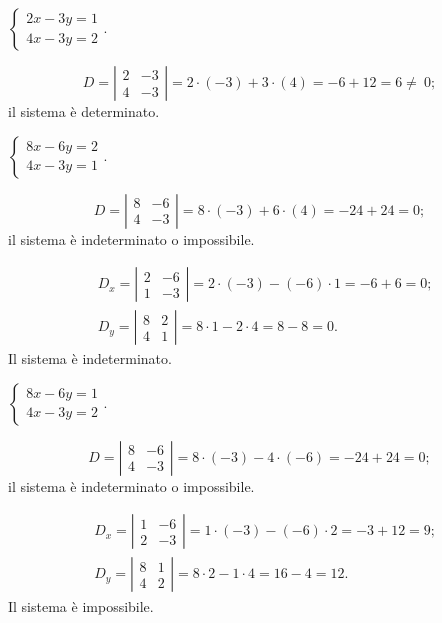 \begin{exrig}
 \begin{esempio}
$\left\{\begin{array}{l}2x-3y=1 \\4x-3y=2 \end{array}\right..$

\[D=\left|\begin{array}{cc}2&-3\\4&-3\end{array}\right|=2\cdot (-3)+3\cdot (4)=-6+12=6\neq~0;\]
il sistema è determinato.
 \end{esempio}

 \begin{esempio}
$\left\{\begin{array}{l}8x-6y=2 \\4x-3y=1 \end{array}\right..$

\[D=\left|\begin{array}{cc}{8}&{-6}\\{4}&{-3}\end{array}\right|=8\cdot (-3)+6\cdot (4)=-24+24=0;\]
il sistema è indeterminato o impossibile.

\begin{align*}
& D_{x}=\left|\begin{array}{cc}{2}&{-6}\\{1}&{-3}\end{array}\right|=2\cdot(-3)-(-6)\cdot 1=-6+6=0;\\
& D_{y}=\left|\begin{array}{cc}{8}&{2}\\{4}&{1}\end{array}\right|=8\cdot1-2\cdot 4=8-8=0.
\end{align*}
Il sistema è indeterminato.
 \end{esempio}

 \begin{esempio}
$\left\{\begin{array}{l}8x-6y=1 \\4x-3y=2\end{array}\right..$


\[D=\left|\begin{array}{cc}{8}&{-6}\\{4}&{-3}\end{array}\right|=8\cdot(-3)-4\cdot (-6)=-24+24=0;\]
il sistema è indeterminato o impossibile.

\begin{align*}
& D_{x}=\left|\begin{array}{cc}{1}&{-6}\\{2}&{-3}\end{array}\right|=1\cdot(-3)-(-6)\cdot 2=-3+12=9;\\
& D_{y}=\left|\begin{array}{cc}{8}&{1}\\{4}&{2}\end{array}\right|=8\cdot2-1\cdot 4=16-4=12.
\end{align*}
Il sistema è impossibile.
 \end{esempio}
\end{exrig}
